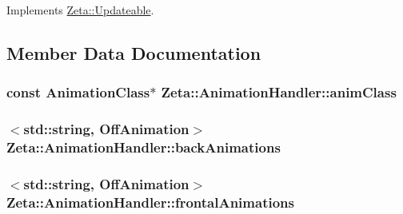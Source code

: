 Implements \hyperlink{classZeta_1_1Updateable_af4006bfccb762454b4da08786ad93de0}{Zeta\+::\+Updateable}.



\subsection{Member Data Documentation}
\hypertarget{classZeta_1_1AnimationHandler_a7b87046e8ddd604eaba79f49a2ee3de5}{
\subsubsection[{anim\+Class}]{\setlength{\rightskip}{0pt plus 5cm}const {\bf Animation\+Class}$\ast$ Zeta\+::\+Animation\+Handler\+::anim\+Class\hspace{0.3cm}{\ttfamily [private]}}}\label{classZeta_1_1AnimationHandler_a7b87046e8ddd604eaba79f49a2ee3de5}
\hypertarget{classZeta_1_1AnimationHandler_a7bc18188974f6605cb89466cd5677155}{
\subsubsection[{back\+Animations}]{$<$std\+::string, {\bf Off\+Animation}$>$ Zeta\+::\+Animation\+Handler\+::back\+Animations\hspace{0.3cm}{\ttfamily [private]}}}\label{classZeta_1_1AnimationHandler_a7bc18188974f6605cb89466cd5677155}
\hypertarget{classZeta_1_1AnimationHandler_acac6efc040935b01a3c1705c2b9ed9a0}{
\subsubsection[{frontal\+Animations}]{$<$std\+::string, {\bf Off\+Animation}$>$ Zeta\+::\+Animation\+Handler\+::frontal\+Animations\hspace{0.3cm}{\ttfamily [private]}}}\label{classZeta_1_1AnimationHandler_acac6efc040935b01a3c1705c2b9ed9a0}
